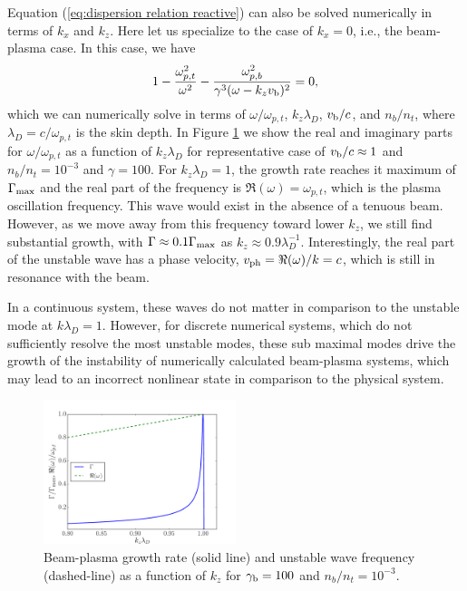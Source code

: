 \documentclass[usenatbib,iop,apj,numberedappendix]{aeb_emulateapj_2015}
\newcommand{\gammabeam}{\ensuremath{\gamma_{\rm b}}}
\newcommand{\vbeam}{\ensuremath{v_{\rm b}}}
\begin{document}
Equation (\ref{eq:dispersion relation reactive}) can also be solved numerically in terms of $k_x$ and $k_z$.  Here let us specialize to the case of $k_x = 0$, i.e., the beam-plasma case.  In this case, we have 
\begin{equation}\label{eq:dispersion relation beam-plasma}
 1 - \frac{\omega_{p,t}^2}{\omega^2} - \frac{\omega_{p,b}^2}{\gamma^3(\omega-k_z \vbeam)^2} = 0,
\end{equation}
which we can numerically solve in terms of $\omega/\omega_{p,t}$, $k_z\lambda_D$, $\vbeam/c$, and $n_b/n_t$, where $\lambda_D = c/\omega_{p,t}$ is the skin depth.  In Figure \ref{fig:OffResonance} we show the real and imaginary parts for $\omega/\omega_{p,t}$ as a function of $k_z\lambda_D$ for representative case of $\vbeam/c \approx 1$ and $n_b/n_t = 10^{-3}$ and $\gamma=100$.    For $k_z\lambda_D = 1$, the growth rate reaches it maximum of $\Gamma_{\rm max}$ and the real part of the frequency is $\Re(\omega) = \omega_{p,t}$, which is the plasma oscillation frequency.  This wave would exist in the absence of a tenuous beam.  However, as we move away from this frequency toward lower $k_z$, we still find substantial growth, with $\Gamma \approx 0.1 \Gamma_{\rm max}$ as $k_z \approx 0.9\lambda_D^{-1}$.  Interestingly, the real part of the unstable wave has a phase velocity, $v_{\rm ph} = \Re(\omega)/k = c$, which is still in resonance with the beam.  

In a continuous system, these waves do not matter in comparison to the unstable mode at $k\lambda_D = 1$.   However, for discrete numerical systems, which do not sufficiently resolve the most unstable modes, these sub maximal modes drive the growth of the instability of numerically calculated beam-plasma systems, which may lead to an incorrect nonlinear state in comparison to the physical system.

\begin{figure}
\includegraphics[width=0.5\textwidth]{off_res.pdf}
\caption{Beam-plasma growth rate (solid line) and unstable wave frequency (dashed-line) as a function of
  $k_z$ for $\gammabeam = 100$ and $n_b/n_t=10^{-3}$. \label{fig:OffResonance}}
\end{figure}
\end{document}
